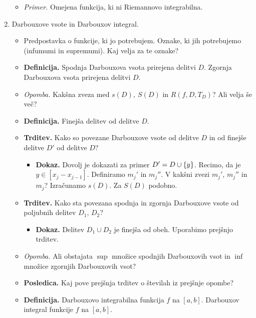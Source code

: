 \begin{enumerate}
\begin{itemize}
        \item \colorbox{yellow!30}{\emph{Primer.}} Omejena funkcija, ki ni Riemannovo integrabilna.
    \end{itemize}
    \item Darbouxove vsote in Darbouxov integral.
    \begin{itemize}
        \item Predpostavka o funkcije, ki jo potrebujem. Oznake, ki jih potrebujemo (infumumi in supremumi). Kaj velja za te oznake?
        \item \colorbox{purple!30}{\textbf{Definicija.}} Spodnja Darbouxova vsota prirejena delitvi $D$. Zgornja Darbouxova vsota prirejena delitvi $D$.
        \item \colorbox{yellow!30}{\emph{Opomba.}} Kakšna zveza med $s(D), \ S(D)$ in $R(f, D, T_D)$? Ali velja še več?
        \item \colorbox{purple!30}{\textbf{Definicija.}} Finejša delitev od delitve $D$.
        \item \colorbox{blue!30}{\textbf{Trditev.}} Kako so povezane Darbouxove vsote od delitve $D$ in od finejše delitve $D'$ od delitve $D$?
        \begin{itemize}
            \item \colorbox{green!30}{\textbf{Dokaz.}} Dovolj je dokazati za primer $D' = D \cup \left\{y\right\}$. Recimo, da je $y \in [x_j - x_{j-1}]$. Definiramo $m_j'$ in $m_j''$. V kakšni zvezi $m_j'$, $m_j''$ in $m_j$? Izračunamo $s(D)$.             
            Za $S(D)$ podobno.
        \end{itemize}
        \item \colorbox{blue!30}{\textbf{Trditev.}} Kako sta povezana spodnja in zgornja Darbouxove vsote od poljubnih delitev $D_1$, $D_2$?
        \begin{itemize}
            \item \colorbox{green!30}{\textbf{Dokaz.}} Delitev $D_1 \cup D_2$ je finejša od obeh. Uporabimo prejšnjo trditev.
        \end{itemize}
        \item \colorbox{yellow!30}{\emph{Opomba.}} Ali obstajata $\sup$ množice spodnjih Darbouxovih vsot in $\inf$  množice zgornjih Darbouxovih vsot?
        \item \colorbox{orange!30}{\textbf{Posledica.}} Kaj pove prejšnja trditev o številah iz prejšnje opombe?
        \item \colorbox{purple!30}{\textbf{Definicija.}} Darbouxovo integrabilna funkcija $f$ na $[a, b]$. Darbouxov integral funkcije $f$ na $[a, b]$.
        

\end{itemize}
\end{enumerate}
